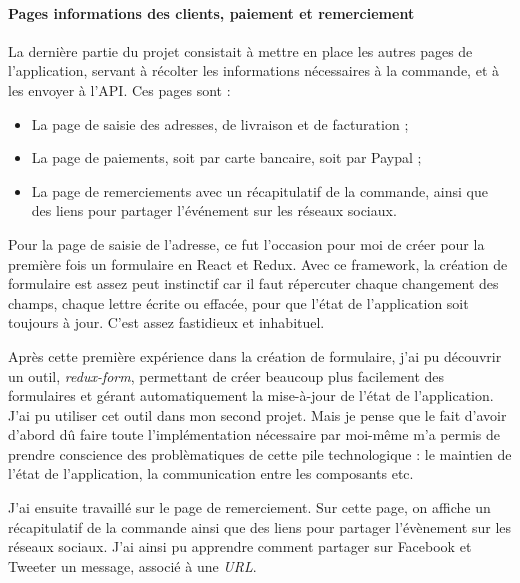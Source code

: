 \paragraph{Pages informations des clients, paiement et
remerciement}\label{pages-informations-des-clients-paiement-et-remerciement}

\bigskip

La dernière partie du projet consistait à mettre en place les autres
pages de l'application, servant à récolter les informations nécessaires
à la commande, et à les envoyer à l'API. Ces pages sont :

\begin{itemize}
\tightlist
\item
  La page de saisie des adresses, de livraison et de facturation ;
\item
  La page de paiements, soit par carte bancaire, soit par Paypal ;
\item
  La page de remerciements avec un récapitulatif de la commande, ainsi
  que des liens pour partager l'événement sur les réseaux sociaux.
\end{itemize}

\bigskip

Pour la page de saisie de l'adresse, ce fut l'occasion pour moi de créer
pour la première fois un formulaire en React et Redux. Avec ce
framework, la création de formulaire est assez peut instinctif car il
faut répercuter chaque changement des champs, chaque lettre écrite ou
effacée, pour que l'état de l'application soit toujours à jour. C'est
assez fastidieux et inhabituel.

\bigskip

Après cette première expérience dans la création de formulaire, j'ai pu
découvrir un outil, \emph{redux-form}, permettant de créer beaucoup plus
facilement des formulaires et gérant automatiquement la mise-à-jour de
l'état de l'application. J'ai pu utiliser cet outil dans mon second
projet. Mais je pense que le fait d'avoir d'abord dû faire toute
l'implémentation nécessaire par moi-même m'a permis de prendre
conscience des problèmatiques de cette pile technologique : le maintien
de l'état de l'application, la communication entre les composants etc.

\bigskip

J'ai ensuite travaillé sur le page de remerciement. Sur cette page, on
affiche un récapitulatif de la commande ainsi que des liens pour
partager l'évènement sur les réseaux sociaux. J'ai ainsi pu apprendre
comment partager sur Facebook et Tweeter un message, associé à une
\emph{URL}.

